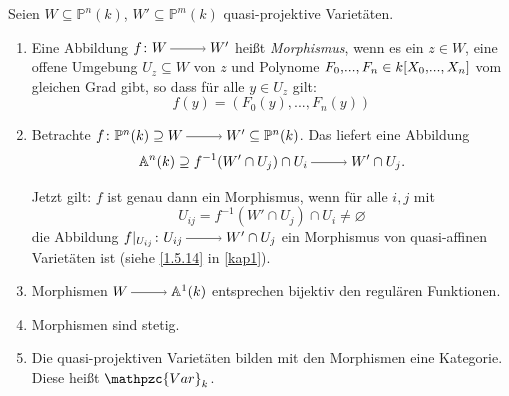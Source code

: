 \documentclass[a4paper,12pt]{scrbook}
\def\A{\mathbb{A}}
\def\P{\mathbb{P}}
\newcommand{\Var}{\mathpzc{Var}}
\newcommand{\leer}{\ensuremath{\varnothing}}
\newcommand{\restrict}[1]{|_{#1}}
\renewcommand{\dotsc}{\ensuremath{\!...}}
\newcommand{\ra}{\raisebox{-1pt}{\tikz{\draw[thin,shorten >=3pt, ->] (0,0) node{\hspace*{-2pt}} -- node{} (1,0);}}\penalty1000\relax}
\newcommand{\ppolyx}[1][n]{\ensuremath%
  [X_{0},\dotsc,X_{#1}]}
\begin{document}
\begin{db}\label{2.6.1}
Seien $W\subseteq \P^n(k)$, $W'\subseteq \P^m(k)$ quasi-projektive Varietäten.
  \begin{enumerate}
  \item{} Eine Abbildung $f\colon W\ra W'$ heißt \emph{Morphismus}, wenn es ein $z \in W$, eine offene Umgebung $U_z \subseteq W$ von $z$ und Polynome $F_0,\dotsc,F_n \in k\ppolyx$ vom gleichen Grad gibt, so dass für alle $y \in U_z$ gilt:
\[f(y)=(F_0(y),\dotsc,F_n(y))\]
  \item{} Betrachte $f \colon \P^n(k)\supseteq W \ra W' \subseteq \P^n(k)$. Das liefert eine Abbildung 
  \[\A^n(k)\supseteq f^{-1}(W'\cap U_j) \cap U_i \ra W' \cap U_j.\] 

Jetzt gilt:
$f$ ist genau dann ein Morphismus, wenn für alle $i,j$ mit \[U_{ij}=f^{-1}(W'\cap U_j) \cap U_i \neq \leer\] die Abbildung $f\restrict{U_{ij}} \colon U_{ij} \ra W'\cap U_j$ ein Morphismus von quasi-affinen Varietäten ist (siehe \cref{1.5.14} in \cref{kap1}).
  \item{} Morphismen $W\ra \A^1(k)$ entsprechen bijektiv den regulären Funktionen.
  \item{} Morphismen sind stetig.
  \item{} Die quasi-projektiven Varietäten bilden mit den Morphismen eine Kategorie. Diese heißt $\Var_k$.
  \end{enumerate}
\end{db}
\end{document}
